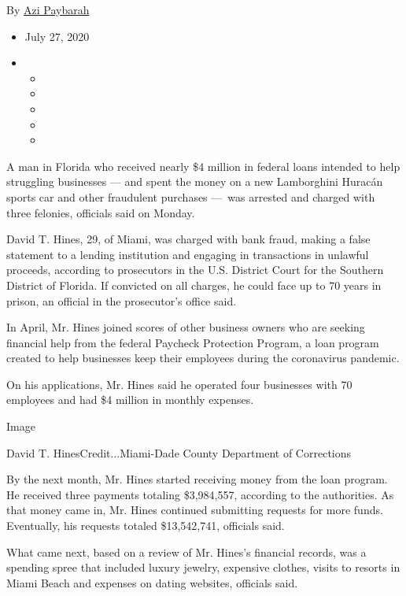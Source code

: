By \href{https://www.nytimes3xbfgragh.onion/by/azi-paybarah}{Azi
Paybarah}

\begin{itemize}
\item
  July 27, 2020
\item
  \begin{itemize}
  \item
  \item
  \item
  \item
  \item
  \end{itemize}
\end{itemize}

A man in Florida who received nearly \$4 million in federal loans
intended to help struggling businesses --- and spent the money on a new
Lamborghini Huracán sports car and other fraudulent purchases ---~was
arrested and charged with three felonies, officials said on Monday.

David T. Hines, 29, of Miami, was charged with bank fraud, making a
false statement to a lending institution and engaging in transactions in
unlawful proceeds, according to prosecutors in the U.S. District Court
for the Southern District of Florida. If convicted on all charges, he
could face up to 70 years in prison, an official in the prosecutor's
office said.

In April, Mr. Hines joined scores of other business owners who are
seeking financial help from the federal Paycheck Protection Program, a
loan program created to help businesses keep their employees during the
coronavirus pandemic.

On his applications, Mr. Hines said he operated four businesses with 70
employees and had \$4 million in monthly expenses.

Image

David T. HinesCredit...Miami-Dade County Department of Corrections

By the next month, Mr. Hines started receiving money from the loan
program. He received three payments totaling \$3,984,557, according to
the authorities. As that money came in, Mr. Hines continued submitting
requests for more funds. Eventually, his requests totaled \$13,542,741,
officials said.

What came next, based on a review of Mr. Hines's financial records, was
a spending spree that included luxury jewelry, expensive clothes, visits
to resorts in Miami Beach and expenses on dating websites, officials
said.

